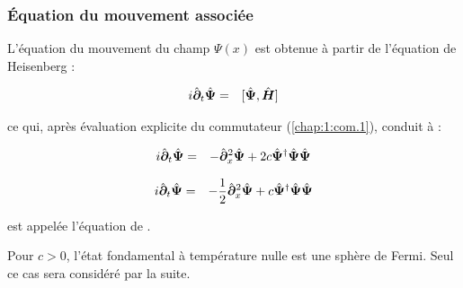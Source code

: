 \subsubsection{Équation du mouvement associée}

L’équation du mouvement du champ \( \Psi(x) \) est obtenue à partir de l’équation de Heisenberg :

\begin{eqnarray}
	i\hat{\bm{\partial}}_t	\hat{\bm{\Psi}} & = & [ \hat{\bm{\Psi}} , \hat{\bm{H}} ]
\end{eqnarray}

ce qui, après évaluation explicite du commutateur (\ref{chap:1:com.1}), conduit à :


\begin{eqnarray}
	i \hat{\bm{\partial}}_t \hat{\bm{\Psi}}	 & = & - \hat{\bm{\partial}}_x^2 \hat{\bm{\Psi}} + 2c \hat{\bm{\Psi}}^\dag\hat{\bm{\Psi}} \hat{\bm{\Psi}}
\end{eqnarray}

\begin{eqnarray}
	i \hat{\bm{\partial}}_t \hat{\bm{\Psi}}	 & = & - \frac{1}{2}\hat{\bm{\partial}}_x^2 \hat{\bm{\Psi}} + c \hat{\bm{\Psi}}^\dag\hat{\bm{\Psi}} \hat{\bm{\Psi}}
\end{eqnarray}

est appelée l'équation de .

Pour $c > 0$, l'état fondamental à température nulle est une sphère de Fermi. Seul ce cas sera considéré par la suite.





 
